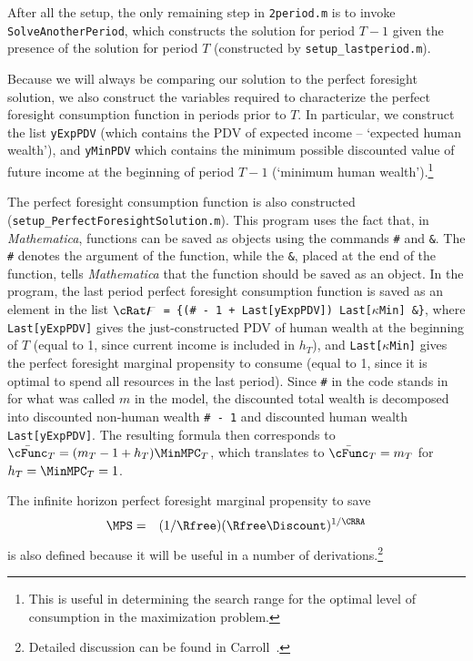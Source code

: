 \documentclass[titlepage]{\econtex}
\newcommand{\Mma}{\textit{Mathematica}}
\begin{document}
After all the setup, the only remaining step in
\texttt{2period.m} is to invoke \texttt{SolveAnotherPeriod}, which
constructs the solution for period $T-1$ given the presence of the
solution for period $T$ (constructed by \texttt{setup\_lastperiod.m}).

Because we will always be comparing our solution to the perfect
foresight solution, we also construct the variables required to
characterize the perfect foresight consumption function in periods
prior to $T$.  In particular, we construct the list \texttt{yExpPDV}
(which contains the PDV of expected income -- `expected human
wealth'), and \texttt{yMinPDV} which contains the minimum possible
discounted value of future income at the beginning of period $T-1$
(`minimum human wealth').\footnote{This is useful in determining the
  search range for the optimal level of consumption in the
  maximization problem.}

The perfect foresight consumption function is also constructed
(\texttt{setup\_PerfectForesightSolution.m}).  This program uses the
fact that, in {\Mma}, functions can be saved as objects using the
commands \texttt{\#} and \texttt{\&}. The \texttt{\#} denotes the
argument of the function, while the \texttt{\&}, placed at the end of
the function, tells {\Mma} that the function should be saved as an
object. In the program, the last period perfect foresight consumption
function is saved as an element in the list \texttt{$\cRat\digamma$ =
  \{(\# - 1 + Last[yExpPDV]) Last[$\kappa$Min] \&\}}, where
\texttt{Last[yExpPDV]} gives the just-constructed PDV of human wealth
at the beginning of $T$ (equal to 1, since current income is included
in $h_{T}$), and \texttt{Last[$\kappa$Min]} gives the perfect
foresight marginal propensity to consume (equal to 1, since it is
optimal to spend all resources in the last period). Since \texttt{\#}
in the code stands in for what was called $m$ in the model, the
discounted total wealth is decomposed into discounted non-human wealth
\texttt{\# - 1} and discounted human wealth
\texttt{Last[yExpPDV]}. The resulting formula then corresponds to
$\bar{\cFunc}_{T} = (m_{T}-1+{h}_{T})\MinMPC_{T}$, which translates to
$\bar{\cFunc}_{T} = m_{T}$ for ${h}_{T}=\MinMPC_{T}=1$.

The infinite horizon perfect foresight marginal propensity to save 
\begin{eqnarray}
\MPS & = & (1/\Rfree)(\Rfree \Discount)^{1/\CRRA} \label{eq:lambdadefn}
\end{eqnarray}
is also defined because it will be useful in a number of derivations.\footnote{Detailed discussion can
be found in Carroll~\citeyearpar{BufferStockTheory}.}
\end{document}
